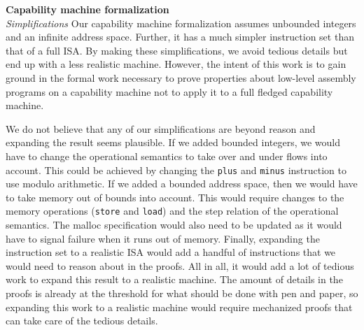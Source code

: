 \documentclass[format=acmsmall, review=true, screen=true]{acmart}
\newenvironment{toplas}{}{}
\begin{document}
\begin{toplas}
  \noindent \textbf{Capability machine formalization}\\
  \emph{Simplifications} Our capability machine formalization assumes unbounded integers and an infinite address space.
  Further, it has a much simpler instruction set than that of a full ISA.
  By making these simplifications, we avoid tedious details but end up with a less realistic machine.
  However, the intent of this work is to gain ground in the formal work necessary to prove properties about low-level assembly programs on a capability machine not to apply it to a full fledged capability machine.

  We do not believe that any of our simplifications are beyond reason and expanding the result seems plausible.
  If we added bounded integers, we would have to change the operational
  semantics to take over and under flows into account. This could be achieved
  by changing the \texttt{plus} and \texttt{minus} instruction to use modulo
  arithmetic.
  If we added a bounded address space, then we would have to take memory out of
  bounds into account. This would require changes to the memory
  operations (\texttt{store} and \texttt{load}) and the step relation of the operational semantics.
  The malloc specification would also need to be updated as it would have to
  signal failure when it runs out of memory.
  Finally, expanding the instruction set to a realistic ISA would add a handful
  of instructions that we would need to reason about in the proofs.
  All in all, it would add a lot of tedious work to expand this result to a
  realistic machine. The amount of details in the proofs is already at the
  threshold for what should be done with pen and paper, so expanding this work
  to a realistic machine would require mechanized proofs that can take care of
  the tedious details.
\end{toplas}
\\\\
\end{document}
